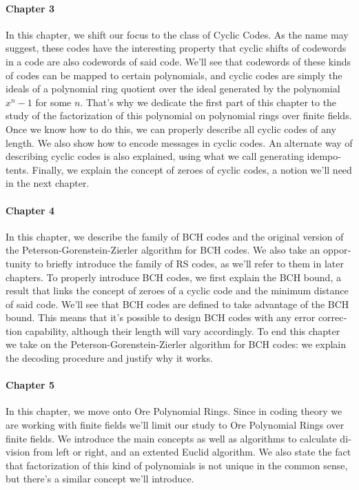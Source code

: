 \begin{otherlanguage}{english}
\paragraph{Chapter 3} In this chapter, we shift our focus to the class of Cyclic Codes. 
As the name may suggest, these codes have the interesting property that cyclic shifts of codewords in a code are also codewords of said code.
We'll see that codewords of these kinds of codes can be mapped to certain polynomials, and cyclic codes are simply the ideals of a polynomial ring quotient over the ideal generated by the polynomial \(x^n - 1\) for some \(n\).
That's why we dedicate the first part of this chapter to the study of the factorization of this polynomial on polynomial rings over finite fields.
Once we know how to do this, we can properly describe all cyclic codes of any length.
We also show how to encode messages in cyclic codes.
An alternate way of describing cyclic codes is also explained, using what we call generating idempotents.
Finally, we explain the concept of zeroes of cyclic codes, a notion we'll need in the next chapter.

\paragraph{Chapter 4} In this chapter, we describe the family of BCH codes and the original version of the Peterson-Gorenstein-Zierler algorithm for BCH codes.
We also take an opportunity to briefly introduce the family of RS codes, as we'll refer to them in later chapters.
To properly introduce BCH codes, we first explain the BCH bound, a result that links the concept of zeroes of a cyclic code and the minimum distance of said code.
We'll see that BCH codes are defined to take advantage of the BCH bound.
This means that it's possible to design BCH codes with any error correction capability, although their length will vary accordingly.
To end this chapter we take on the Peterson-Gorenstein-Zierler algorithm for BCH codes: we explain the decoding procedure and justify why it works.

\paragraph{Chapter 5} In this chapter, we move onto Ore Polynomial Rings.
Since in coding theory we are working with finite fields we'll limit our study to Ore Polynomial Rings over finite fields.
We introduce the main concepts as well as algorithms to calculate division from left or right, and an extented Euclid algorithm.
We also state the fact that factorization of this kind of polynomials is not unique in the common sense, but there's a similar concept we'll introduce.


\end{otherlanguage}
